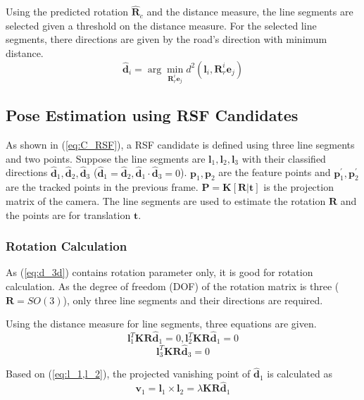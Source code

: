 \documentclass[letterpaper, 10 pt, conference]{ieeeconf}  %
\begin{document}
Using the predicted rotation $\hat{\mathbf{R}}_c$ and the distance measure, the line segments are selected given a threshold on the distance measure. For the selected line segments, there directions are given by the road's direction with minimum distance.
\begin{equation}
\hat{\mathbf{d}}_i = \arg\min _{\mathbf{R}_r^i\mathbf{e}_j} d^2(\mathbf{l}_i,\mathbf{R}_r^i\mathbf{e}_j)
\end{equation}

\subsection{Pose Estimation using RSF Candidates}
As shown in (\ref{eq:C_RSF}), a RSF candidate is defined using three line segments and two points. Suppose the line segments are $\mathbf{l}_1,\mathbf{l}_2,\mathbf{l}_3$ with their classified directions $\hat{\mathbf{d}}_1,\hat{\mathbf{d}}_2,\hat{\mathbf{d}}_3$ ($\hat{\mathbf{d}}_1=\hat{\mathbf{d}}_2,\hat{\mathbf{d}}_1\cdot\hat{\mathbf{d}}_3=0$). $\mathbf{p}_1, \mathbf{p}_2$ are the feature points and $\mathbf{p}_1^\prime, \mathbf{p}_2^\prime$ are the tracked points in the previous frame. $\mathbf{P}=\mathbf{K}[\mathbf{R}|\mathbf{t}]$ is the projection matrix of the camera.
The line segments are used to estimate the rotation $\mathbf{R}$ and the points are for translation $\mathbf{t}$.
\subsubsection{Rotation Calculation}
As (\ref{eq:d_3d}) contains rotation parameter only, it is good for rotation calculation. As the degree of freedom (DOF) of the rotation matrix is three ($\mathbf{R}=SO(3)$), only three line segments and their directions are required.

Using the distance measure for line segments, three equations are given.
\begin{equation}
\mathbf{l}_1^T\mathbf{K}\mathbf{R}\hat{\mathbf{d}}_1=0, \mathbf{l}_2^T\mathbf{K}\mathbf{R}\hat{\mathbf{d}}_1=0
\label{eq:l_1,l_2}
\end{equation}
\begin{equation}
\mathbf{l}_3^T\mathbf{K}\mathbf{R}\hat{\mathbf{d}}_3=0
\label{eq:l_3}
\end{equation}

Based on (\ref{eq:l_1,l_2}), the projected vanishing point of $\hat{\mathbf{d}}_1$ is calculated as
\begin{equation}
\mathbf{v}_1 = \mathbf{l}_1\times \mathbf{l}_2 =  \lambda \mathbf{K}\mathbf{R}\hat{\mathbf{d}}_1
\label{eq:vp}
\end{equation}
\end{document}
